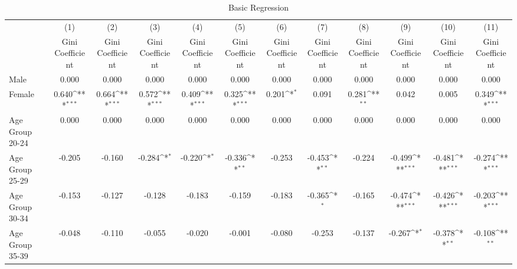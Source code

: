 \begin{table}[htbp]\centering
\def\sym#1{\ifmmode^{#1}\else\(^{#1}\)\fi}
\caption{Basic Regression\label{reg1}}
\begin{tabular}{l*{11}{c}}
\hline\hline
                    &\multicolumn{1}{c}{(1)}&\multicolumn{1}{c}{(2)}&\multicolumn{1}{c}{(3)}&\multicolumn{1}{c}{(4)}&\multicolumn{1}{c}{(5)}&\multicolumn{1}{c}{(6)}&\multicolumn{1}{c}{(7)}&\multicolumn{1}{c}{(8)}&\multicolumn{1}{c}{(9)}&\multicolumn{1}{c}{(10)}&\multicolumn{1}{c}{(11)}\\
                    &\multicolumn{1}{c}{Gini Coefficient}&\multicolumn{1}{c}{Gini Coefficient}&\multicolumn{1}{c}{Gini Coefficient}&\multicolumn{1}{c}{Gini Coefficient}&\multicolumn{1}{c}{Gini Coefficient}&\multicolumn{1}{c}{Gini Coefficient}&\multicolumn{1}{c}{Gini Coefficient}&\multicolumn{1}{c}{Gini Coefficient}&\multicolumn{1}{c}{Gini Coefficient}&\multicolumn{1}{c}{Gini Coefficient}&\multicolumn{1}{c}{Gini Coefficient}\\
\hline
Male                &       0.000         &       0.000         &       0.000         &       0.000         &       0.000         &       0.000         &       0.000         &       0.000         &       0.000         &       0.000         &       0.000         \\
Female              &       0.640\sym{***}&       0.664\sym{***}&       0.572\sym{***}&       0.409\sym{***}&       0.325\sym{***}&       0.201\sym{*}  &       0.091         &       0.281\sym{**} &       0.042         &       0.005         &       0.349\sym{***}\\
Age Group 20-24     &       0.000         &       0.000         &       0.000         &       0.000         &       0.000         &       0.000         &       0.000         &       0.000         &       0.000         &       0.000         &       0.000         \\
Age Group 25-29     &      -0.205         &      -0.160         &      -0.284\sym{*}  &      -0.220\sym{*}  &      -0.336\sym{**} &      -0.253         &      -0.453\sym{**} &      -0.224         &      -0.499\sym{***}&      -0.481\sym{***}&      -0.274\sym{***}\\
Age Group 30-34     &      -0.153         &      -0.127         &      -0.128         &      -0.183         &      -0.159         &      -0.183         &      -0.365\sym{*}  &      -0.165         &      -0.474\sym{***}&      -0.426\sym{***}&      -0.203\sym{***}\\
Age Group 35-39     &      -0.048         &      -0.110         &      -0.055         &      -0.020         &      -0.001         &      -0.080         &      -0.253         &      -0.137         &      -0.267\sym{*}  &      -0.378\sym{**} &      -0.108\sym{**} \\

\end{tabular}
\end{table}
